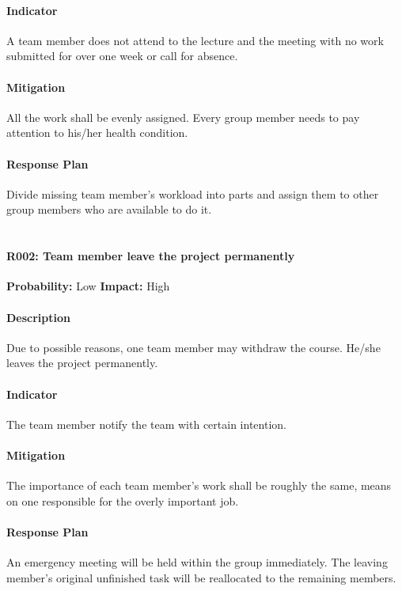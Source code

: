 \documentclass[11pt, a4paper]{report}
\begin{document}
	\paragraph{Indicator}A team member does not attend to the lecture and the meeting with no work submitted for over one week or call for absence.
	\paragraph{Mitigation}All the work shall be evenly assigned. Every group member needs to pay attention to his/her health condition.
	\paragraph{Response Plan}Divide missing team member's workload into parts and assign them to other group members who are available to do it. \\\\


	\paragraph{R002: Team member leave the project permanently} \hspace{1cm} \textbf{Probability: }Low\hspace{1cm}   \textbf{Impact: }High
	\paragraph{Description}Due to possible reasons, one team member may withdraw the course. He/she leaves the project permanently.
	\paragraph{Indicator}The team member notify the team with certain intention.
	\paragraph{Mitigation}The importance of each team member's work shall be roughly the same, means on one responsible for the overly important job. 
	\paragraph{Response Plan}An emergency meeting will be held within the group immediately.  The leaving member's original unfinished task will be reallocated to the remaining members.\\\\
\end{document}
